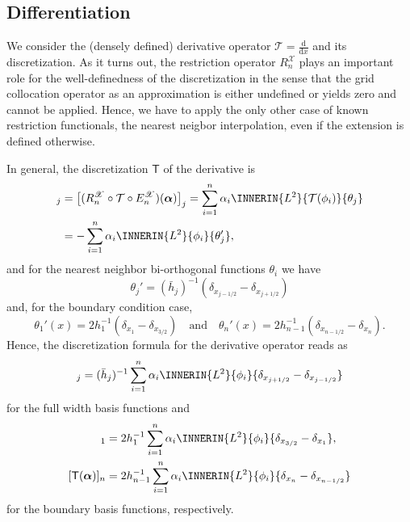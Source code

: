 \documentclass[a4paper]{paper}
\newcommand*{\SPC}[1]{{\ensuremath{\mathscr{#1}}}}
\newcommand*{\OP}[1]{{\ensuremath{\mathcal{#1}}}}
\newcommand*{\OPT}{\OP{T}}
\newcommand{\DISCOP}[1]{{\ensuremath{\mathsf{#1}}}}
\newcommand*{\DISCOPT}{\DISCOP{T}}
\newcommand*{\EXT}[2]{\ensuremath{E_{#1}^{#2}}}
\newcommand*{\REST}[2]{\ensuremath{R_{#1}^{#2}}}
\newcommand*{\RnX}{{\ensuremath{\REST{n}{\SPC{X}}}}}
\newcommand*{\EnX}{{\ensuremath{\EXT{n}{\SPC{X}}}}}
\newcommand*{\D}{{\ensuremath{\mathrm{d}}}}
\newcommand*{\BDalpha}{\boldsymbol{\alpha}}
\begin{document}
\subsection{Differentiation}
\label{subsec:specif:deriv}

We consider the (densely defined) derivative operator $\OPT = \frac{\D}{\D x}$ and its discretization. As it turns out, 
the restriction operator $\RnX$ plays an important role for the well-definedness of the discretization in the sense 
that the grid collocation operator as an approximation is either undefined or yields zero and cannot be applied. Hence, 
we have to apply the only other case of known restriction functionals, the nearest neigbor interpolation, even if the 
extension is defined otherwise.

In general, the discretization $\DISCOPT$ of the derivative is
%
\begin{align*}
 [\DISCOPT(\BDalpha)]_j
 &= \big[(\RnX \circ \OPT \circ \EnX)(\BDalpha)\big]_j = \sum_{i=1}^n \alpha_i \INNERIN{L^2}{\OPT(\phi_i)}{\theta_j} \\
 &= -\sum_{i=1}^n \alpha_i \INNERIN{L^2}{\phi_i}{\theta_j'},
\end{align*}
%
and for the nearest neighbor bi-orthogonal functions $\theta_i$ we have
%
\begin{equation*}
 \theta_j' = (\bar h_j)^{-1} (\delta_{x_{j-1/2}} - \delta_{x_{j+1/2}})
\end{equation*}
%
and, for the boundary condition case,
%
\begin{equation*}
 \theta_1'(x) =  2h_1^{-1} (\delta_{x_1} - \delta_{x_{3/2}}) \quad \text{and} \quad
 \theta_n'(x) =  2h_{n-1}^{-1} (\delta_{x_{n-1/2}} - \delta_{x_n}).
\end{equation*}
%
Hence, the discretization formula for the derivative operator reads as
%
\begin{equation*}
 [\DISCOPT(\BDalpha)]_j 
 = (\bar h_j)^{-1} \sum_{i=1}^n 
  \alpha_i \INNERIN{L^2}{\phi_i}{\delta_{x_{j+1/2}} - \delta_{x_{j-1/2}}}
\end{equation*}
%
for the full width basis functions and
%
\begin{align*}
 [\DISCOPT(\BDalpha)]_1 
 &= 2h_1^{-1} \sum_{i=1}^n
  \alpha_i \INNERIN{L^2}{\phi_i}{\delta_{x_{3/2}} - \delta_{x_1}}, \\
 [\DISCOPT(\BDalpha)]_n 
 &= 2h_{n-1}^{-1} \sum_{i=1}^n 
 \alpha_i \INNERIN{L^2}{\phi_i}{\delta_{x_{n}} - \delta_{x_{n-1/2}}}
\end{align*}
%
for the boundary basis functions, respectively.
\end{document}
